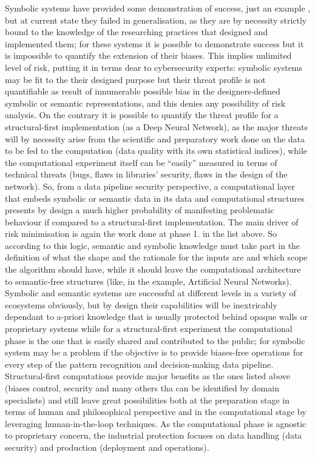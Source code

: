 \documentclass[14pt]{extarticle}
\begin{document}
\newline
Symbolic systems have provided some demonstration of success, just an example \cite{SUNsymconn}, but at current state they failed in generalisation, as they are by necessity strictly bound to the knowledge of the researching practices that designed and implemented them; for these systems it is possible to demonstrate success but it is impossible to quantify the extension of their biases. This implies unlimited level of risk, putting it in terms dear to cybersecurity experts: symbolic systems may be fit to the their designed purpose but their threat profile is not quantifiable as result of innumerable possible bias in the designers-defined symbolic or semantic representations, and this denies any possibility of risk analysis. On the contrary it is possible to quantify the threat profile for a structural-first implementation (as a Deep Neural Network), as the major threats will by necessity arise from the scientific and preparatory work done on the data to be fed to the computation (data quality with its own statistical indices), while the computational experiment itself can be “easily” measured in terms of technical threats (bugs, flaws in libraries’ security, flaws in the design of the network). So, from a data pipeline security perspective, a computational layer that embeds symbolic or semantic data in its data and computational structures presents by design a much higher probability of manifesting problematic behaviour if compared to a structural-first implementation. The main driver of risk minimisation is again the work done at phase 1. in the list above. 
\newline
So according to this logic, semantic and symbolic knowledge must take part in the definition of what the shape and the rationale for the inputs are and which scope the algorithm should have, while it should leave the computational architecture to semantic-free structures (like, in the example, Artificial Neural Networks). Symbolic and semantic systems are successful at different levels in a variety of ecosystems obviously, but by design their capabilities will be inextricably dependant to a-priori knowledge that is usually protected behind opaque walls or proprietary systems while for a structural-first experiment the computational phase is the one that is easily shared and contributed to the public; for symbolic system may be a problem if the objective is to provide biases-free operations for every step of the pattern recognition and decision-making data pipeline. Structural-first computations provide major benefits as the ones listed above (biases control, security and many others tha can be identified by domain specialists) and still leave great possibilities both at the preparation stage in terms of human and philosophical perspective and in the computational stage by leveraging human-in-the-loop techniques. As the computational phase is agnostic to proprietary concern, the industrial protection focuses on data handling (data security) and production (deployment and operations).
\end{document}
